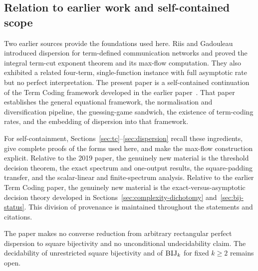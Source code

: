\documentclass[11pt]{article}
\newcommand{\parencite}[1]{\citep{#1}}
\theoremstyle{definition}
\theoremstyle{plain}
\begin{document}
\subsection{Relation to earlier work and self-contained scope}
\label{subsec:provenance}
Two earlier sources provide the foundations used here.  Riis and Gadouleau~\parencite{riis2019max} introduced
dispersion for term-defined communication networks and proved the integral term-cut exponent theorem and its
max-flow computation.  They also exhibited a related four-term, single-function instance with full asymptotic
rate but no perfect interpretation.  The present paper is a self-contained continuation of the Term Coding
framework developed in the earlier paper~\parencite{riis2026termcoding}.  That paper establishes the general
equational framework, the normalisation and diversification pipeline, the guessing-game sandwich, the existence
of term-coding rates, and the embedding of dispersion into that framework.

For self-containment, Sections~\ref{sec:tc}--\ref{sec:dispersion} recall these ingredients, give complete proofs
of the forms used here, and make the max-flow construction explicit.  Relative to the 2019 paper, the genuinely
new material is the threshold decision theorem, the exact spectrum and one-output results, the square-padding
transfer, and the scalar-linear and finite-spectrum analysis.  Relative to the earlier Term Coding paper, the
genuinely new material is the exact-versus-asymptotic decision theory developed in
Sections~\ref{sec:complexity-dichotomy} and~\ref{sec:bij-status}.  This division of provenance is maintained
throughout the statements and citations.

The paper makes no converse reduction from arbitrary rectangular perfect dispersion to square bijectivity and
no unconditional undecidability claim.  The decidability of unrestricted square bijectivity and of
$\textsc{BIJ}_k$ for fixed $k\ge2$ remains open.
\end{document}
